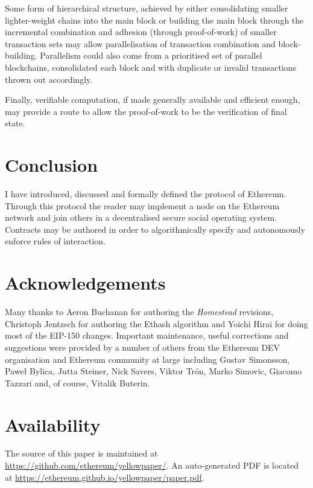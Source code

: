 \documentclass[9pt,oneside]{amsart}
\begin{document}
\begin{multicols}{2}
Some form of hierarchical structure, achieved by either consolidating smaller lighter-weight chains into the main block or building the main block through the incremental combination and adhesion (through proof-of-work) of smaller transaction sets may allow parallelisation of transaction combination and block-building. Parallelism could also come from a prioritised set of parallel blockchains, consolidated each block and with duplicate or invalid transactions thrown out accordingly.

Finally, verifiable computation, if made generally available and efficient enough, may provide a route to allow the proof-of-work to be the verification of final state.

\section{Conclusion} \label{ch:conclusion}

I have introduced, discussed and formally defined the protocol of Ethereum. Through this protocol the reader may implement a node on the Ethereum network and join others in a decentralised secure social operating system. Contracts may be authored in order to algorithmically specify and autonomously enforce rules of interaction.

\section{Acknowledgements}

Many thanks to Aeron Buchanan for authoring the \textit{Homestead} revisions, Christoph Jentzsch for authoring the Ethash algorithm and Yoichi Hirai for doing most of the EIP-150 changes. Important maintenance, useful corrections and suggestions were provided by a number of others from the Ethereum DEV organisation and Ethereum community at large including Gustav Simonsson, Pawe\l{} Bylica, Jutta Steiner, Nick Savers, Viktor Tr\'{o}n, Marko Simovic, Giacomo Tazzari and, of course, Vitalik Buterin.

\section{Availability}

The source of this paper is maintained at \url{https://github.com/ethereum/yellowpaper/}. An auto-generated PDF is located at \url{https://ethereum.github.io/yellowpaper/paper.pdf}.




\end{multicols}
\end{document}
